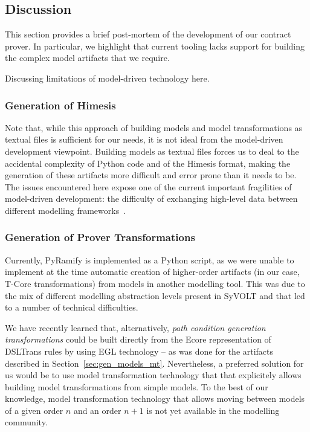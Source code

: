 \subsection{Discussion}
\label{subsec:tool_discussion}

This section provides a brief post-mortem of the development of our contract prover. In particular, we highlight that current tooling lacks support for building the complex model artifacts that we require.

Discussing limitations of model-driven technology here.


\subsubsection{Generation of Himesis}

Note that, while this approach of building models and model transformations as
textual files is sufficient for our needs, it is not ideal from the model-driven
development viewpoint. Building models as textual files forces us to deal to
the accidental complexity of Python code and of the Himesis format, making the
generation of these artifacts more difficult and error prone than it needs to
be. The issues encountered here expose one of the current important fragilities
of model-driven development: the difficulty of exchanging high-level data
between different modelling frameworks~.

\subsubsection{Generation of Prover Transformations}

Currently, PyRamify is implemented as a Python script, as we were unable to
implement at the time automatic creation of higher-order artifacts (in our
case, T-Core transformations) from models in another modelling tool.
This was due to the mix of different modelling abstraction levels present in
SyVOLT and that led to a number of technical difficulties.

We have recently learned that, alternatively, \emph{path condition generation
transformations} could be built directly from the Ecore representation of
DSLTrans rules by using EGL technology -- as was done for the artifacts
described in Section~\ref{sec:gen_models_mt}. Nevertheless, a preferred solution
for us would be to use model transformation technology that that explicitely
allows building model transformations from simple models. To the best of our
knowledge, model transformation technology that allows moving between models of
a given order $n$ and an order $n+1$ is not yet available in the modelling
community.
